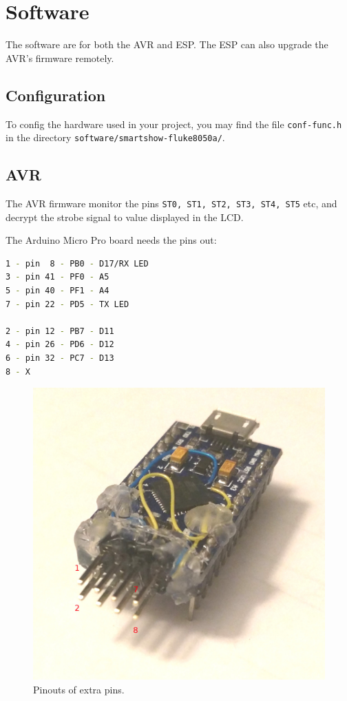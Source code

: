 \documentclass[a4paper,10pt]{article}
\begin{document}
\clearpage

\section{Software}

The software are for both the AVR and ESP.
The ESP can also upgrade the AVR's firmware remotely.



\subsection{Configuration}

To config the hardware used in your project, you may find the file
\texttt{conf-func.h} in the directory \texttt{software/smartshow-fluke8050a/}.







\subsection{AVR}
The AVR firmware monitor the pins \texttt{ST0, ST1, ST2, ST3, ST4, ST5} etc,
and decrypt the strobe signal to value displayed in the LCD.


The Arduino Micro Pro board needs the pins out:
\begin{lstlisting}[language=bash]
1 - pin  8 - PB0 - D17/RX LED
3 - pin 41 - PF0 - A5
5 - pin 40 - PF1 - A4
7 - pin 22 - PD5 - TX LED

2 - pin 12 - PB7 - D11
4 - pin 26 - PD6 - D12
6 - pin 32 - PC7 - D13
8 - X
\end{lstlisting}



\begin{figure}[h!t] \centering
    \includegraphics[width=0.40\linewidth]{figures/micropro-morepin-front.jpg}
    \caption{Pinouts of extra pins.} \label{fig:mocropropins}
\end{figure}
\end{document}
